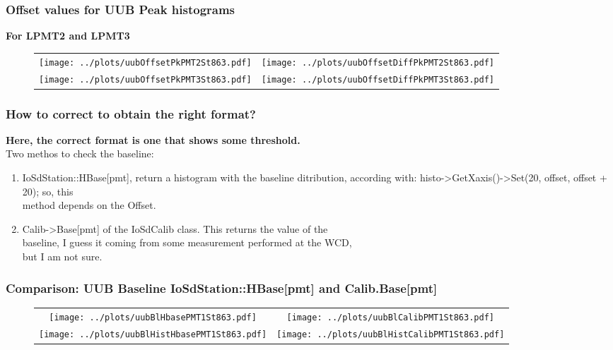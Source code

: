 \documentclass[aspectratio=169]{beamer}
\begin{document}
			
\begin{frame}
	\frametitle{Offset values for UUB Peak histograms}
	{\bf For LPMT2 and LPMT3}
	\begin{figure}
		\centering
		\begin{tabularx}{\textwidth}{CC}
			\texttt{[image: ../plots/uubOffsetPkPMT2St863.pdf]}
			&
			\texttt{[image: ../plots/uubOffsetDiffPkPMT2St863.pdf]}
			\\
			\texttt{[image: ../plots/uubOffsetPkPMT3St863.pdf]}
			&
			\texttt{[image: ../plots/uubOffsetDiffPkPMT3St863.pdf]}
		\end{tabularx}
	\end{figure}
\end{frame}


\begin{frame}
	\frametitle{How to correct to obtain the right format?}
	{\bf Here, the correct format is one that shows some threshold.\\}
	\vspace{0.75cm}
	Two methos to check the baseline:
	\vspace{0.5cm}
	\begin{enumerate}
		\item IoSdStation::HBase[pmt], return a histogram with the baseline ditribution,
			according with: histo->GetXaxis()->Set(20, offset, offset + 20); so, this \\
			method depends on the Offset.
		\item Calib->Base[pmt] of the IoSdCalib class. This returns the value of the \\
			baseline, I guess it coming from some measurement performed at the WCD, \\
			but I am not sure.
	\end{enumerate}
\end{frame}




\begin{frame}
	\frametitle{Comparison: UUB Baseline IoSdStation::HBase[pmt] and Calib.Base[pmt]}
	\begin{figure}
		\centering
		\begin{tabularx}{\textwidth}{CC}
			\texttt{[image: ../plots/uubBlHbasePMT1St863.pdf]}
			&
			\texttt{[image: ../plots/uubBlCalibPMT1St863.pdf]}
			\\
			\texttt{[image: ../plots/uubBlHistHbasePMT1St863.pdf]}
			&
			\texttt{[image: ../plots/uubBlHistCalibPMT1St863.pdf]}
		\end{tabularx}
	\end{figure}
\end{frame}
\end{document}
